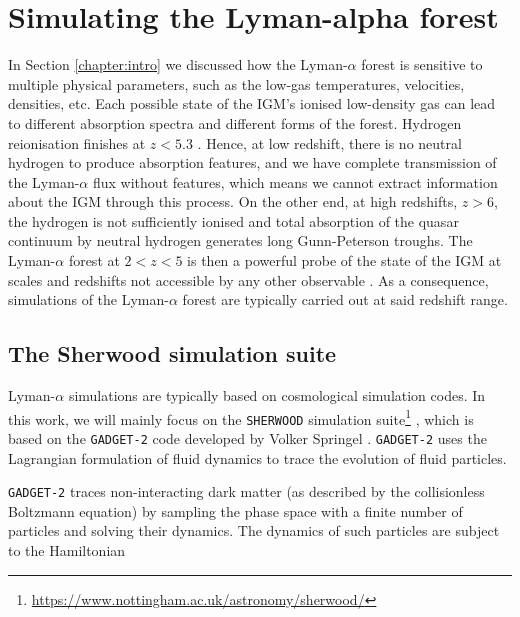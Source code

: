 \chapter{Simulating the Lyman-alpha forest} \label{chap:sherwood}
In Section \ref{chapter:intro} we discussed how the Lyman-$\alpha$ forest is sensitive to multiple physical parameters, such as the low-gas temperatures, velocities, densities, etc. Each possible state of the IGM's ionised low-density gas can lead to different absorption spectra and different forms of the forest. Hydrogen reionisation finishes at $z<5.3$ \cite{Bosman_2022}. Hence, at low redshift, there is no neutral hydrogen to produce absorption features, and we have complete transmission of the Lyman-$\alpha$ flux without features, which means we cannot extract information about the IGM through this process. On the other end, at high redshifts, $z>6$, the hydrogen is not sufficiently ionised and total absorption of the quasar continuum by neutral hydrogen generates long Gunn-Peterson troughs. The Lyman-$\alpha$ forest at $2<z<5$ is then a powerful probe of the state of the IGM at scales and redshifts not accessible by any other observable \cite{Hernquist__1996}. As a consequence, simulations of the Lyman-$\alpha$ forest are typically carried out at said redshift range.














\section{The Sherwood simulation suite}\label{sec:sherwood suite}
Lyman-$\alpha$ simulations are typically based on cosmological simulation codes.
In this work, we will mainly focus on the \texttt{SHERWOOD} simulation suite\footnote{\url{https://www.nottingham.ac.uk/astronomy/sherwood/}} \cite{Bolton_2016}, which is based on the \texttt{GADGET-2} code developed by Volker Springel \cite{Springel_2005}. \texttt{GADGET-2} uses the Lagrangian formulation of fluid dynamics to trace the evolution of fluid particles.


\texttt{GADGET-2} traces non-interacting dark matter (as described by the collisionless Boltzmann equation) by sampling the phase space with a finite number of particles and solving their dynamics. The dynamics of such particles are subject to the Hamiltonian

